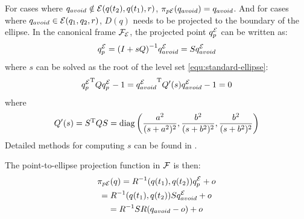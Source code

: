 \documentclass[10pt,twocolumn,twoside]{IEEEtran}
\begin{document}
For cases where $q_{avoid} \notin \mathcal{E}(q(t_2),q(t_1),r)$, $\pi_{p\mathcal{E}}(q_{avoid}) = q_{avoid}$. And for cases where $q_{avoid} \in \mathcal{E}(q_1,q_2,r)$, $D(q)$ needs to be projected to the boundary of the ellipse. 
In the canonical frame $\mathcal{F}_{\mathcal{E}}$, the projected point $q^{\mathcal{E}}_{p}$ can be written as:
  \begin{equation}
  	q^{\mathcal{E}}_{p} = {(I+sQ)}^{-1} q^{\mathcal{E}}_{avoid} = S q^{\mathcal{E}}_{avoid}
  \end{equation}
where $s$ can be solved as the root of the level set \eqref{equ:standard-ellipse}:
  \begin{equation}
    {q^{\mathcal{E}}_p}^\mathrm{T} Q q^{\mathcal{E}}_p-1={q^{\mathcal{E}}_{avoid}}^\mathrm{T} Q'(s) q^{\mathcal{E}}_{avoid} -1=0
  \end{equation}
  where
  \begin{equation}
    Q'(s) =S^\mathrm{T} Q S = \operatorname{diag}\left(\frac{a^{2}}{(s+a^{2})^2}, \frac{b^{2}}{(s+b^{2})^2},\frac{b^{2}}{(s+b^{2})^2}\right)
  \end{equation}
 Detailed methods for computing $s$ can be found in \cite{yang2021multi,yang2020multi,eberly}. 




The point-to-ellipse projection function in $\mathcal{F}$ is then:
  \begin{multline}\label{equ:Point2EllipseProjection}
    \pi_{p\mathcal{E}}(q)= R^{-1}(q(t_1),q(t_2))q^{\mathcal{E}}_p+o \\
    = R^{-1}(q(t_1),q(t_2))Sq^{\mathcal{E}}_{avoid}+o\\
    = R^{-1}S R ( q_{avoid}- o)+o
  \end{multline}
  
\end{document}
